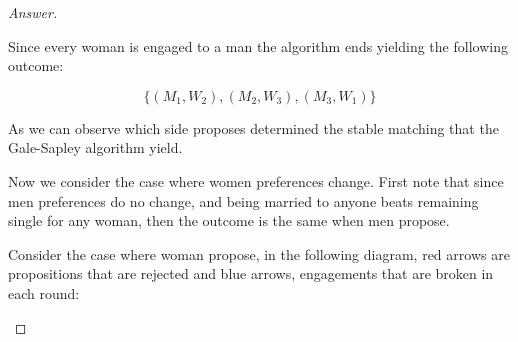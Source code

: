 \documentclass{article}
\theoremstyle{definition}
\begin{document}
\begin{proof}[Answer]
\begin{center}

\end{center}

Since every woman is engaged to a man the algorithm ends yielding the following outcome:

$$\{(M_1, W_2), (M_2, W_3), (M_3, W_1)\}$$

As we can observe which side proposes determined the stable matching that the Gale-Sapley algorithm yield.

Now we consider the case where women preferences change. First note that since men preferences do no change, and being married to anyone beats remaining single for any woman, then the outcome is the same when men propose.


Consider the case where woman propose, in the following diagram, red arrows are propositions that are rejected and blue arrows, engagements that are broken in each round:

\begin{center}




\begin{tikzpicture}[x=0.75pt,y=0.75pt,yscale=-1,xscale=1]


\end{tikzpicture}
\end{center}
\end{proof}
\end{document}
